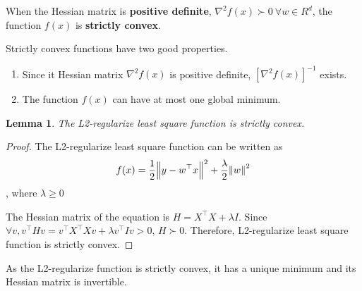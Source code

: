 \documentclass{article}
\newtheorem{lemma}{Lemma}
\theoremstyle{definition}
\theoremstyle{remark}
\begin{document}
When the Hessian matrix is \textbf{positive definite}, $\nabla^{2}f(x) \succ 0\ \forall w \in R^{d}$, the function $f(x)$ is \textbf{strictly convex}.

Strictly convex functions have two good properties.
\begin{enumerate}
    \item Since it Hessian matrix $\nabla^{2}f(x)$ is positive definite, $[\nabla^{2}f(x)]^{-1}$ exists.
    \item The function $f(x)$ can have at most one global minimum.
\end{enumerate}

\begin{lemma}
The L2-regularize least square function is strictly convex.
\end{lemma}
\begin{proof}
The L2-regularize least square function can be written as 
\begin{equation}
    f(x)=\frac{1}{2}\norm{y - w^{\top}x}^{2} + \frac{\lambda}{2} \norm{w}^{2}
\end{equation}, where $\lambda \geq 0$

The Hessian matrix of the equation is $H = X^{\top}X + \lambda I$. Since $\forall v, v^{\top}Hv = v^{\top}X^{\top}Xv + \lambda v^{\top}Iv > 0$, $H \succ 0$. Therefore, L2-regularize least square function is strictly convex.
\end{proof}

As the L2-regularize function is strictly convex, it has a unique minimum and its Hessian matrix is invertible.
\end{document}
